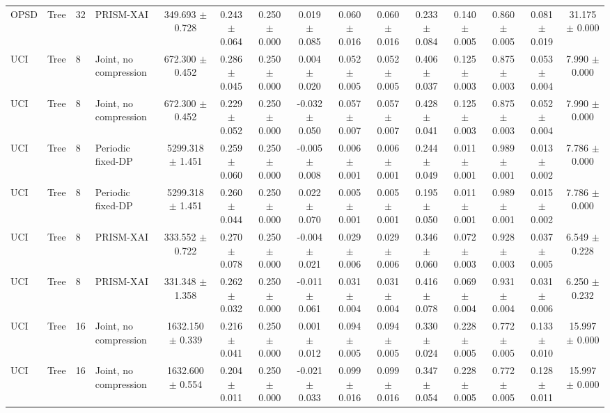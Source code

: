 \begin{tabular}{llllccccccccccc}
OPSD & Tree & 32 & PRISM-XAI & 349.693 $\pm$ 0.728 & 0.243 $\pm$ 0.064 & 0.250 $\pm$ 0.000 & 0.019 $\pm$ 0.085 & 0.060 $\pm$ 0.016 & 0.060 $\pm$ 0.016 & 0.233 $\pm$ 0.084 & 0.140 $\pm$ 0.005 & 0.860 $\pm$ 0.005 & 0.081 $\pm$ 0.019 & 31.175 $\pm$ 0.000 \\
UCI & Tree & 8 & Joint, no compression & 672.300 $\pm$ 0.452 & 0.286 $\pm$ 0.045 & 0.250 $\pm$ 0.000 & 0.004 $\pm$ 0.020 & 0.052 $\pm$ 0.005 & 0.052 $\pm$ 0.005 & 0.406 $\pm$ 0.037 & 0.125 $\pm$ 0.003 & 0.875 $\pm$ 0.003 & 0.053 $\pm$ 0.004 & 7.990 $\pm$ 0.000 \\
UCI & Tree & 8 & Joint, no compression & 672.300 $\pm$ 0.452 & 0.229 $\pm$ 0.052 & 0.250 $\pm$ 0.000 & -0.032 $\pm$ 0.050 & 0.057 $\pm$ 0.007 & 0.057 $\pm$ 0.007 & 0.428 $\pm$ 0.041 & 0.125 $\pm$ 0.003 & 0.875 $\pm$ 0.003 & 0.052 $\pm$ 0.004 & 7.990 $\pm$ 0.000 \\
UCI & Tree & 8 & Periodic fixed-DP & 5299.318 $\pm$ 1.451 & 0.259 $\pm$ 0.060 & 0.250 $\pm$ 0.000 & -0.005 $\pm$ 0.008 & 0.006 $\pm$ 0.001 & 0.006 $\pm$ 0.001 & 0.244 $\pm$ 0.049 & 0.011 $\pm$ 0.001 & 0.989 $\pm$ 0.001 & 0.013 $\pm$ 0.002 & 7.786 $\pm$ 0.000 \\
UCI & Tree & 8 & Periodic fixed-DP & 5299.318 $\pm$ 1.451 & 0.260 $\pm$ 0.044 & 0.250 $\pm$ 0.000 & 0.022 $\pm$ 0.070 & 0.005 $\pm$ 0.001 & 0.005 $\pm$ 0.001 & 0.195 $\pm$ 0.050 & 0.011 $\pm$ 0.001 & 0.989 $\pm$ 0.001 & 0.015 $\pm$ 0.002 & 7.786 $\pm$ 0.000 \\
UCI & Tree & 8 & PRISM-XAI & 333.552 $\pm$ 0.722 & 0.270 $\pm$ 0.078 & 0.250 $\pm$ 0.000 & -0.004 $\pm$ 0.021 & 0.029 $\pm$ 0.006 & 0.029 $\pm$ 0.006 & 0.346 $\pm$ 0.060 & 0.072 $\pm$ 0.003 & 0.928 $\pm$ 0.003 & 0.037 $\pm$ 0.005 & 6.549 $\pm$ 0.228 \\
UCI & Tree & 8 & PRISM-XAI & 331.348 $\pm$ 1.358 & 0.262 $\pm$ 0.032 & 0.250 $\pm$ 0.000 & -0.011 $\pm$ 0.061 & 0.031 $\pm$ 0.004 & 0.031 $\pm$ 0.004 & 0.416 $\pm$ 0.078 & 0.069 $\pm$ 0.004 & 0.931 $\pm$ 0.004 & 0.031 $\pm$ 0.006 & 6.250 $\pm$ 0.232 \\
UCI & Tree & 16 & Joint, no compression & 1632.150 $\pm$ 0.339 & 0.216 $\pm$ 0.041 & 0.250 $\pm$ 0.000 & 0.001 $\pm$ 0.012 & 0.094 $\pm$ 0.005 & 0.094 $\pm$ 0.005 & 0.330 $\pm$ 0.024 & 0.228 $\pm$ 0.005 & 0.772 $\pm$ 0.005 & 0.133 $\pm$ 0.010 & 15.997 $\pm$ 0.000 \\
UCI & Tree & 16 & Joint, no compression & 1632.600 $\pm$ 0.554 & 0.204 $\pm$ 0.011 & 0.250 $\pm$ 0.000 & -0.021 $\pm$ 0.033 & 0.099 $\pm$ 0.016 & 0.099 $\pm$ 0.016 & 0.347 $\pm$ 0.054 & 0.228 $\pm$ 0.005 & 0.772 $\pm$ 0.005 & 0.128 $\pm$ 0.011 & 15.997 $\pm$ 0.000 \\

\end{tabular}
